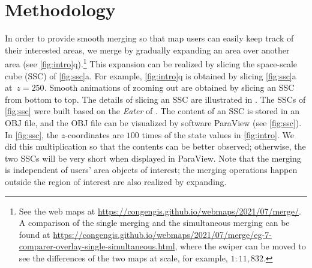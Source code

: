 \documentclass[twocolumn]{svjour3}          %
\begin{document}






%


\section{Methodology}
\label{sec:methodology}


In order to provide smooth merging
so that map users can easily keep track of their interested areas,
we merge by gradually expanding an area over another area
(see \fig\ref{fig:intro}q).\footnote{%
See the web maps at
\url{https://congengis.github.io/webmaps/2021/07/merge/}.
A comparison of the single merging and the simultaneous merging can be found at 
\url{https://congengis.github.io/webmaps/2021/07/merge/eg-7-comparer-overlay-single-simultaneous.html},
where the swiper can be moved to see the differences of the two maps at scale, 
for example, $1:11{,}832$.}
This expansion can be realized 
by slicing the space-scale cube (SSC) of
\fig\ref{fig:ssc}a.
For example,  \fig\ref{fig:intro}q is obtained by slicing
\fig\ref{fig:ssc}a at~$z= 250$.
Smooth animations of zooming out are obtained by
slicing an SSC from bottom to top.
The details of slicing an SSC are illustrated in \citet{Meijers2020Web}.
The SSCs of \fig\ref{fig:ssc} were built 
based on the \emph{Eater} of \citet{Suba2014Merge}.
The content of an SSC is stored in an OBJ file,
and the OBJ file can be visualized by software ParaView
(see \fig\ref{fig:ssc}).
In \fig\ref{fig:ssc}, the $z$-coordinates are $100$ times of
the state values in \fig\ref{fig:intro}.
We did this multiplication so that the contents can be better observed;
otherwise, the two SSCs will be very short when displayed in ParaView.
Note that the merging is independent of users' area objects of interest;
the merging operations happen outside the region of interest 
are also realized by expanding.
\end{document}
